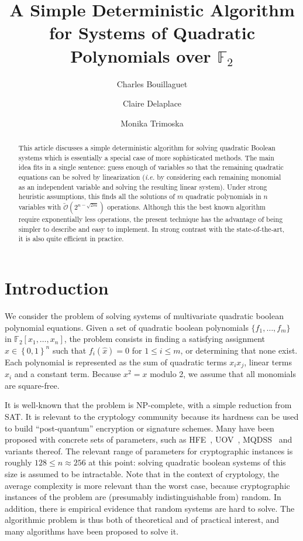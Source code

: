 \documentclass[a4paper,UKenglish,cleveref, autoref]{lipics-v2019}
\title{A Simple Deterministic Algorithm for Systems of Quadratic Polynomials over $\mathbb{F}_2$}
\author{Charles Bouillaguet}{LIP6 laboratory, Sorbonne Université, Paris, France}{charles.bouillaguet@lip6.fr}{https://orcid.org/0000-0001-9416-6244}{}
\author{Claire Delaplace}{MIS Laboratory, Université de Picardie Jules Verne, Amiens, France}{claire.delaplace@u-picardie.fr}{}{}
\author{Monika Trimoska}{MIS Laboratory, Université de Picardie Jules Verne, Amiens, France}{monika.trimoska@u-picardie.fr}{}{}
\newcommand{\bits}{\left\{0, 1\right\}}
\newcommand{\bigOsoft}[1]{\ensuremath{\mathcal{\tilde O}\left( #1 \right)} }
\begin{document}
\maketitle

\begin{abstract}
  This article discusses a simple deterministic algorithm for solving quadratic
  Boolean systems which is essentially a special case of more sophisticated
  methods. The main idea fits in a single sentence: guess enough of variables so
  that the remaining quadratic equations can be solved by linearization
  (\textit{i.e.} by considering each remaining monomial as an independent
  variable and solving the resulting linear system). Under strong heuristic
  assumptions, this finds all the solutions of $m$ quadratic polynomials in $n$
  variables with $\bigOsoft{2^{n-\sqrt{2m}}}$ operations. Although this the best
  known algorithm require exponentially less operations, the present technique
  has the advantage of being simpler to describe and easy to implement. In
  strong contrast with the state-of-the-art, it is also quite efficient in
  practice.
\end{abstract}


\clearpage

\section{Introduction}

We consider the problem of solving systems of multivariate quadratic boolean
polynomial equations. Given a set of quadratic boolean polynomials
$\{f_1, \dots, f_m\}$ in $\mathbb{F}_2[x_1, \dots, x_n]$, the problem consists
in finding a satisfying assignment $\hat x \in \bits^n$ such that
$f_i(\hat x) = 0$ for $1 \leq i \leq m$, or determining that none exist. Each
polynomial is represented as the sum of quadratic terms $x_i x_j$, linear terms
$x_i$ and a constant term. Because $x^2 = x$ modulo 2, we assume that all
monomials are square-free.



It is well-known that the problem is NP-complete, with a simple reduction from
SAT. It is relevant to the cryptology community because its hardness can be used
to build ``post-quantum'' encryption or signature schemes. Many have been
proposed with concrete sets of parameters, such as HFE~\cite{Patarin96},
UOV~\cite{KipnisPG99}, MQDSS~\cite{ChenHRSS16} and variants thereof.  The
relevant range of parameters for cryptographic instances is roughly
$128 \leq n \approx 256$ at this point: solving quadratic boolean systems of
this size is assumed to be intractable. Note that in the context of cryptology,
the average complexity is more relevant than the worst case, because
cryptographic instances of the problem are (presumably indistinguishable from)
random. In addition, there is empirical evidence that random systems are hard to
solve. The algorithmic problem is thus both of theoretical and of practical
interest, and many algorithms have been proposed to solve it.
\end{document}
